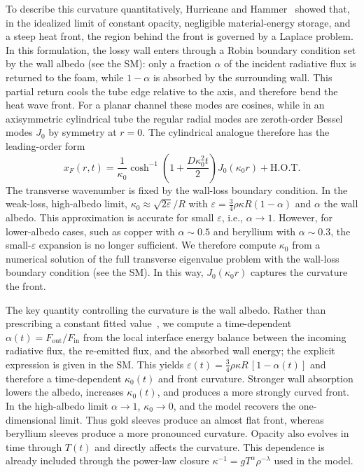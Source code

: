 \documentclass[prl, twocolumn, superscriptaddress, amsmath, amssymb, reprint]{revtex4-2}
\begin{document}
To describe this curvature quantitatively, Hurricane and Hammer~\cite{Hurricane2006} showed that, in the idealized limit of constant opacity, negligible material-energy storage, and a steep heat front, the region behind the front is governed by a Laplace problem. In this formulation, the lossy wall enters through a Robin boundary condition set by the wall albedo (see the SM): only a fraction $\alpha$ of the incident radiative flux is returned to the foam, while $1-\alpha$ is absorbed by the surrounding wall. This partial return cools the tube edge relative to the axis, and therefore bend the heat wave front. For a planar channel these modes are cosines, while in an axisymmetric cylindrical tube the regular radial modes are zeroth-order Bessel modes $J_0$ by symmetry at $r=0$. The cylindrical analogue therefore has the leading-order form~\cite{Courtois2022}
\begin{equation}\label{eq:HH_cyl}
    x_F(r,t) = \frac{1}{\kappa_0}\cosh^{-1}\!\left(1 + \frac{D\kappa_0^2 t}{2}\right)J_0(\kappa_0 r) + \text{H.O.T.}
\end{equation}
The transverse wavenumber is fixed by the wall-loss boundary condition. In the weak-loss, high-albedo limit, $\kappa_0 \approx \sqrt{2\varepsilon}/R$ with $\varepsilon = \tfrac{3}{4}\rho\kappa R(1-\alpha)$ and $\alpha$ the wall albedo. This approximation is accurate for small $\varepsilon$, i.e., $\alpha\to1$. However, for lower-albedo cases, such as copper with $\alpha\sim0.5$ and beryllium with $\alpha\sim0.3$, the small-$\varepsilon$ expansion is no longer sufficient. We therefore compute $\kappa_0$ from a numerical solution of the full transverse eigenvalue problem with the wall-loss boundary condition (see the SM). In this way, $J_0(\kappa_0 r)$ captures the curvature the front.

The key quantity controlling the curvature is the wall albedo. Rather than prescribing a constant fitted value~\cite{Hurricane2006,Courtois2022}, we compute a time-dependent $\alpha(t)=F_{\mathrm{out}}/F_{\mathrm{in}}$ from the local interface energy balance between the incoming radiative flux, the re-emitted flux, and the absorbed wall energy; the explicit expression is given in the SM.
This yields $\varepsilon(t)=\tfrac{3}{4}\rho\kappa R\,[1-\alpha(t)]$ and therefore a time-dependent $\kappa_0(t)$ and front curvature. Stronger wall absorption lowers the albedo, increases $\kappa_0(t)$, and produces a more strongly curved front. In the high-albedo limit $\alpha\to1$, $\kappa_0\to0$, and the model recovers the one-dimensional limit. Thus gold sleeves produce an almost flat front, whereas beryllium sleeves produce a more pronounced curvature.
Opacity also evolves in time through $T(t)$ and directly affects the curvature. This dependence is already included through the power-law closure $\kappa^{-1}=gT^{\alpha}\rho^{-\lambda}$ used in the model.
\end{document}
